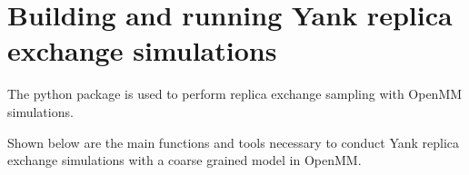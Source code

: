 \documentclass[letterpaper,12pt,english,openany,oneside]{sphinxmanual}
\begin{document}
\section{Building and running Yank replica exchange simulations}
\label{\detokenize{simulation:building-and-running-yank-replica-exchange-simulations}}
The  python package is used to perform replica exchange sampling with OpenMM simulations.

Shown below are the main functions and tools necessary to conduct Yank replica exchange simulations with a coarse grained model in OpenMM.

\label{\detokenize{simulation:module-simulation.rep_exch}}
\end{document}
